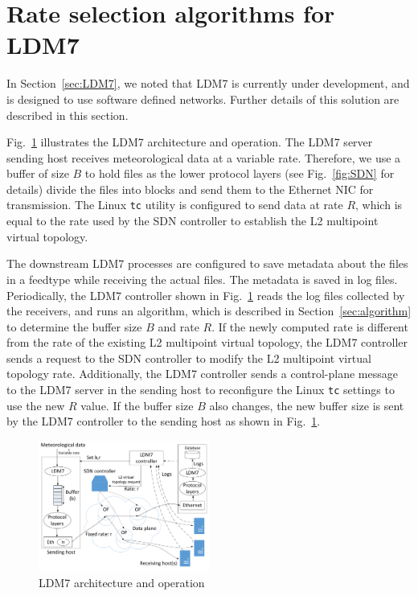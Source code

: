 \section{Rate selection algorithms for LDM7}
In Section~\ref{sec:LDM7}, we noted that LDM7 is currently
under development, and is designed to use software defined networks.
Further details of
this solution are described in this section.

Fig.~\ref{fig:software} illustrates the LDM7
architecture and operation. The LDM7 server sending host receives
meteorological data at a variable rate. Therefore, we use
a buffer of size $B$ to hold files as the lower protocol layers
(see Fig.~\ref{fig:SDN} for details) divide the files into blocks
and send them to the Ethernet NIC for transmission. The Linux \texttt{tc}
utility is configured to send data at rate $R$, which is equal to the rate
used by the SDN controller to establish the L2 multipoint virtual
topology.

The downstream LDM7 processes are configured to save metadata about the files in a feedtype while receiving the actual files. The metadata is saved in log files. Periodically,
the LDM7 controller shown in Fig.~\ref{fig:software}
reads the log files collected by the receivers, and runs an algorithm,
which is described in Section~\ref{sec:algorithm} to determine the
buffer size $B$ and rate $R$. If the newly computed rate is different
from the rate of the existing L2 multipoint virtual topology, the LDM7 controller
sends a request to the SDN controller to modify the L2 multipoint
virtual topology rate.
Additionally, the LDM7 controller sends a control-plane
message to the LDM7 server in the sending host to reconfigure the Linux \texttt{tc} settings to use the new $R$ value. If the buffer size $B$
also changes, the new buffer size is sent by the LDM7 controller to the sending host as shown in Fig.~\ref{fig:software}.

\begin{figure}
\centering
\includegraphics[width=0.5\textwidth]{figures/software.pdf}
\caption{LDM7 architecture and operation}
\label{fig:software}
\end{figure}

